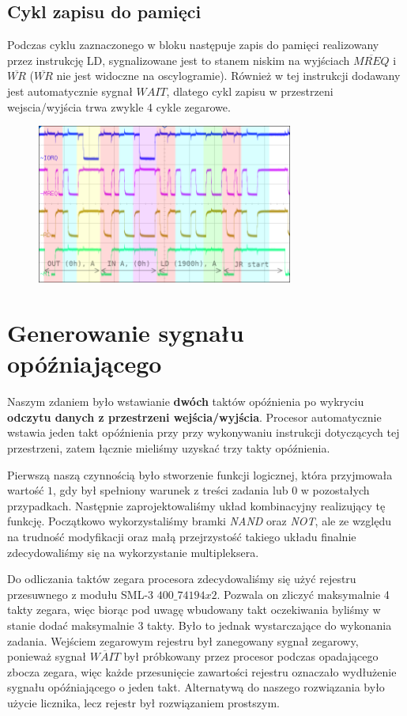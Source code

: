 \documentclass[fleqn]{article}
\newcommand\square[1]{
	\fcolorbox{black}{#1}{\rule{0pt}{6pt}\rule{6pt}{0pt}}
}
\begin{document}
\subsection{Cykl zapisu do pamięci}
Podczas cyklu zaznaczonego w bloku \square{green} następuje zapis do pamięci realizowany przez instrukcję LD, sygnalizowane jest to stanem niskim na wyjściach $\overline{MREQ}$ i $\overline{WR}$ ($\overline{WR}$ nie jest widoczne na oscylogramie). Również w tej instrukcji dodawany jest automatycznie sygnał ${WAIT}$, dlatego cykl zapisu w przestrzeni wejscia/wyjścia trwa zwykle 4 cykle zegarowe.

\begin{figure}[H]
	\centering
	\includegraphics[width=0.75\textwidth]{img/1a.png}
	\caption{}
\end{figure}
\section{Generowanie sygnału opóźniającego}
Naszym zdaniem było wstawianie \textbf{dwóch} taktów opóźnienia po wykryciu \textbf{odczytu danych z przestrzeni wejścia/wyjścia}. Procesor automatycznie wstawia jeden takt opóźnienia przy przy wykonywaniu instrukcji dotyczących tej przestrzeni, zatem łącznie mieliśmy uzyskać trzy takty opóźnienia.

Pierwszą naszą czynnością było stworzenie funkcji logicznej, która przyjmowała wartość $1$, gdy był spełniony warunek z treści zadania lub $0$ w pozostałych przypadkach. Następnie zaprojektowaliśmy układ kombinacyjny realizujący tę funkcję. Początkowo wykorzystaliśmy bramki \textit{NAND} oraz \textit{NOT}, ale ze względu na trudność modyfikacji oraz małą przejrzystość takiego układu finalnie zdecydowaliśmy się na wykorzystanie multipleksera.

Do odliczania taktów zegara procesora zdecydowaliśmy się użyć rejestru przesuwnego z modułu SML-3 ${400\_74194x2}$. Pozwala on zliczyć maksymalnie 4 takty zegara, więc biorąc pod uwagę wbudowany takt oczekiwania byliśmy w stanie dodać maksymalnie 3 takty. Było to jednak wystarczające do wykonania zadania. Wejściem zegarowym rejestru był zanegowany sygnał zegarowy, ponieważ sygnał $\overline{WAIT}$ był próbkowany przez procesor podczas opadającego zbocza zegara, więc każde przesunięcie zawartości rejestru oznaczało wydłużenie sygnału opóźniającego o jeden takt.  Alternatywą do naszego rozwiązania było użycie licznika, lecz rejestr był rozwiązaniem prostszym.
\end{document}
